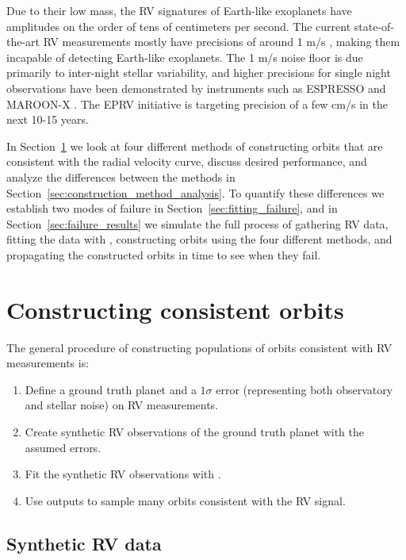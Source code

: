 Due to their low mass, the RV signatures of Earth-like exoplanets have amplitudes on the order of
tens of centimeters per second.  The current state-of-the-art RV measurements mostly have precisions
of around 1 m/s \citep{EPRV2020}, making them incapable of detecting Earth-like exoplanets.
The 1 m/s noise floor is due primarily to inter-night stellar variability, and higher precisions for single
night observations have been demonstrated by instruments such as ESPRESSO \citep{Pepe2021} and
MAROON-X \citep{Seifahrt2021}.  The EPRV initiative is targeting precision of a few
cm/s \citep{EPRV2020} in the next 10-15 years. 

In Section~\ref{sec:consistent_orbits} we look at four different methods of constructing
orbits that are consistent with the radial velocity curve, discuss desired performance, and
analyze the differences between the methods in Section~\ref{sec:construction_method_analysis}. To
quantify these differences we establish two modes of failure in Section~\ref{sec:fitting_failure},
and in Section~\ref{sec:failure_results} we simulate the full process of gathering RV data, fitting
the data with , constructing orbits using the four different methods, and propagating
the constructed orbits in time to see when they fail.

\section{Constructing consistent orbits}%
\label{sec:consistent_orbits}

The general procedure of constructing populations of orbits consistent with RV measurements is:
\begin{enumerate}
    \item Define a ground truth planet and a $1 \sigma$ error (representing both observatory and stellar
        noise) on RV measurements.
    \item Create synthetic RV observations of the ground truth planet with the assumed errors.
    \item Fit the synthetic RV observations with .
    \item Use  outputs to sample many orbits consistent with the RV signal.
\end{enumerate}

\subsection{Synthetic RV data}%
\label{sec:synthetic_RV_data}

